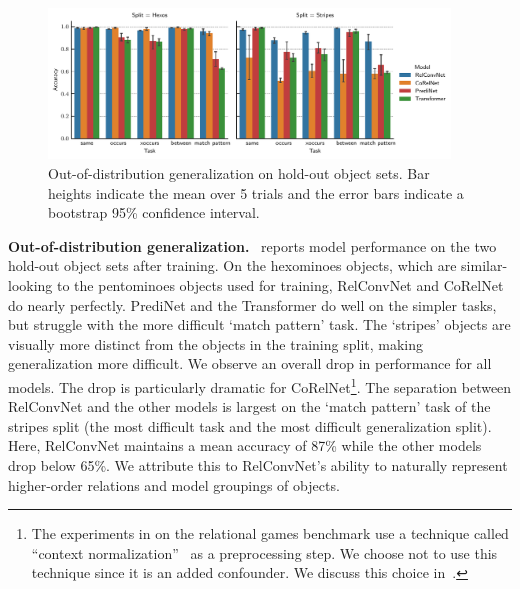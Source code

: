 \begin{figure}[t]
    \centering
    \includegraphics[width=0.95\textwidth]{figs/experiments/relgames_ood_acc.pdf}
    \caption{Out-of-distribution generalization on hold-out object sets. Bar heights indicate the mean over 5 trials and the error bars indicate a bootstrap 95\% confidence interval.}\label{fig:ood_generalization}
\end{figure}

\textbf{Out-of-distribution generalization.}~ reports model performance on the two hold-out object sets after training. On the hexominoes objects, which are similar-looking to the pentominoes objects used for training, RelConvNet and CoRelNet do nearly perfectly. PrediNet and the Transformer do well on the simpler tasks, but struggle with the more difficult `match pattern' task. The `stripes' objects are visually more distinct from the objects in the training split, making generalization more difficult. We observe an overall drop in performance for all models. The drop is particularly dramatic for CoRelNet\footnote{The experiments in \citet{kergNeuralArchitecture2022} on the relational games benchmark use a technique called ``context normalization''~\citep{webbLearningRepresentationsThat2020} as a preprocessing step. We choose not to use this technique since it is an added confounder. We discuss this choice in~.}.
The separation between RelConvNet and the other models is largest on the `match pattern' task of the stripes split (the most difficult task and the most difficult generalization split). Here, RelConvNet maintains a mean accuracy of 87\% while the other models drop below 65\%. We attribute this to RelConvNet's ability to naturally represent higher-order relations and model groupings of objects.



